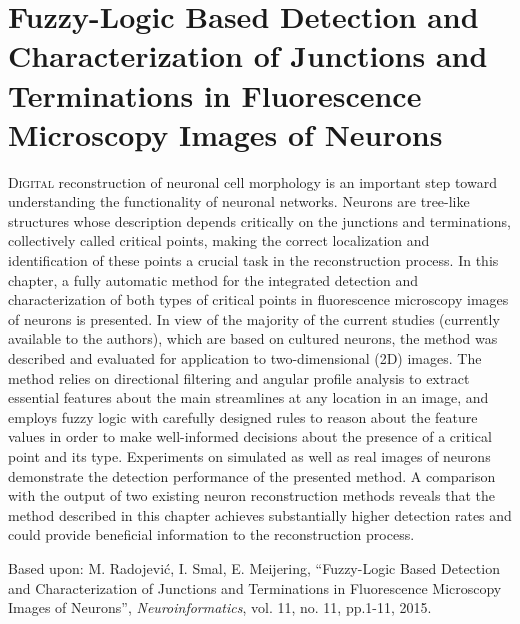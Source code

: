 % 
%
\chpos{15mm}{8mm}
\chapter[Fuzzy-Logic Based Detection and Characterization of Junctions and Terminations in Fluorescence Microscopy Images of Neurons]{Fuzzy-Logic Based Detection and Characterization of Junctions and Terminations in Fluorescence Microscopy Images of Neurons}
\label{ch2:fuzzy}
{\small \lettrine{D}{igital} reconstruction of neuronal cell morphology is an important step toward understanding the functionality of neuronal networks. Neurons are tree-like structures whose description depends critically on the junctions and terminations, collectively called critical points, making the correct localization and identification of these points a crucial task in the reconstruction process. In this chapter, a fully automatic method for the integrated detection and characterization of both types of critical points in fluorescence microscopy images of neurons is presented. In view of the majority of the current studies (currently available to the authors), which are based on cultured neurons, the method was described and evaluated for application to two-dimensional (2D) images. The method relies on directional filtering and angular profile analysis to extract essential features about the main streamlines at any location in an image, and employs fuzzy logic with carefully designed rules to reason about the feature values in order to make well-informed decisions about the presence of a critical point and its type. Experiments on simulated as well as real images of neurons demonstrate the detection performance of the presented method. A comparison with the output of two existing neuron reconstruction methods reveals that the method described in this chapter achieves substantially higher detection rates and could provide beneficial information to the reconstruction process.\par}
\vspace*{11em}
\begin{publish}
Based upon: M. Radojevi\'{c}, I. Smal, E. Meijering, ``Fuzzy-Logic Based Detection and Characterization of Junctions and Terminations in Fluorescence Microscopy Images of Neurons'', \textit{Neuroinformatics}, vol. 11, no. 11, pp.1-11, 2015.   
\end{publish}

